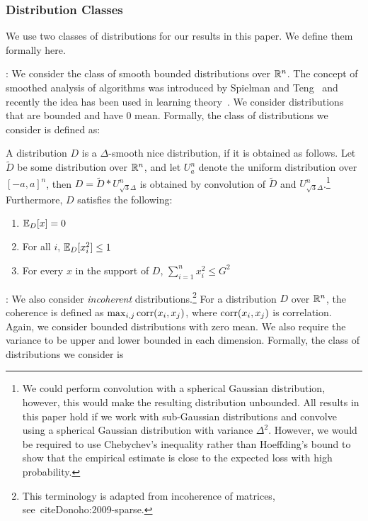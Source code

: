 \subsubsection*{Distribution Classes}

We use two classes of distributions for our results in this paper. We define
them formally here. \medskip 

: We consider the class of smooth
bounded distributions over $\mathbb{R}^n$. The concept of smoothed analysis of
algorithms was introduced by Spielman and Teng~\cite{ST:2004} and recently the
idea has been used in learning theory~\cite{KST:2009,KKM:2013}. We consider
distributions that are bounded and have $0$ mean. Formally, the class of
distributions we consider is defined as:

\begin{definition}
\label{defn:afghanistan} A distribution $D$ is a $\Delta$-smooth nice
distribution, if it is obtained as follows. Let $\tilde{D}$ be some distribution
over $\mathbb{R}^n$, and let $U^n_a$ denote the uniform distribution over $[-a,
a]^n$, then $D = \tilde{D} * U^n_{\sqrt{3}\Delta}$ is obtained by convolution of
$\tilde{D}$ and $U^n_{\sqrt{3} \Delta}$.\footnote{We could perform convolution
with a spherical Gaussian distribution, however, this would make the resulting
distribution unbounded. All results in this paper hold if we work with
sub-Gaussian distributions and convolve using a spherical Gaussian distribution
with variance $\Delta^2$.  However, we would be required to use Chebychev's
inequality rather than Hoeffding's bound to show that the empirical estimate is
close to the expected loss with high probability.} Furthermore, $D$ satisfies
the following:
\begin{enumerate}
\item $\mathbb{E}_D[x] = 0$
\item For all $i$, $\mathbb{E}_D[x_i^2] \leq 1$
\item For every $x$ in the support of $D$, $\sum_{i = 1}^n x_i^2 \leq G^2$
\end{enumerate}
\end{definition}

: We also consider \emph{incoherent}
distributions.\footnote{This terminology is adapted from incoherence of
matrices, \eg see~cite{Donoho:2009-sparse}.}
For a distribution $D$ over $\mathbb{R}^n$, the coherence is defined as
$\max_{i, j} \mathrm{corr}(x_i, x_j)$, where $\mathrm{corr}(x_i, x_j)$ is correlation. Again, we
consider bounded distributions with zero mean. We also require the variance to
be upper and lower bounded in each dimension. Formally, the class of
distributions we consider is

